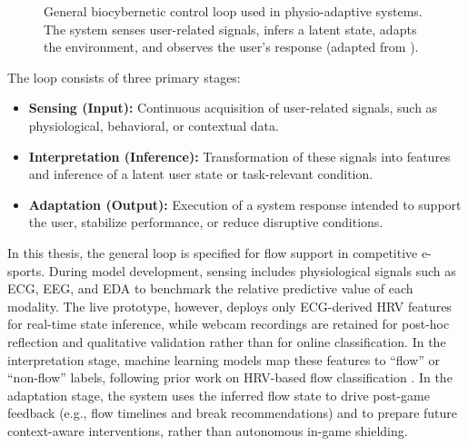 \begin{figure}[htbp]
    \centering
    \caption{General biocybernetic control loop used in physio-adaptive systems. The system senses user-related signals, infers a latent state, adapts the environment, and observes the user's response (adapted from \textcite{chiossi2023how}).}
    \label{fig:biocyberneticLoop}
\end{figure} 

The loop consists of three primary stages:
\begin{itemize}
    \item \textbf{Sensing (Input):} Continuous acquisition of user-related signals, such as physiological, behavioral, or contextual data.
    \item \textbf{Interpretation (Inference):} Transformation of these signals into features and inference of a latent user state or task-relevant condition.
    \item \textbf{Adaptation (Output):} Execution of a system response intended to support the user, stabilize performance, or reduce disruptive conditions.
\end{itemize}

In this thesis, the general loop is specified for flow support in competitive e-sports. During model development, sensing includes physiological signals such as ECG, EEG, and EDA to benchmark the relative predictive value of each modality. The live prototype, however, deploys only ECG-derived HRV features for real-time state inference, while webcam recordings are retained for post-hoc reflection and qualitative validation rather than for online classification. In the interpretation stage, machine learning models map these features to \enquote{flow} or \enquote{non-flow} labels, following prior work on HRV-based flow classification \autocite{9296229}. In the adaptation stage, the system uses the inferred flow state to drive post-game feedback (e.g., flow timelines and break recommendations) and to prepare future context-aware interventions, rather than autonomous in-game shielding.

